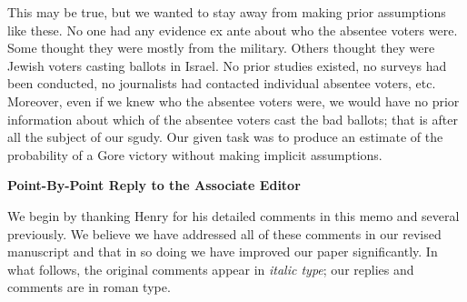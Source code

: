 \documentclass[11pt]{article}
\begin{document}
\begin{enumerate}
  This may be true, but we wanted to stay away from making prior
  assumptions like these.  No one had any evidence ex ante about who
  the absentee voters were.  Some thought they were mostly from the
  military.  Others thought they were Jewish voters casting ballots in
  Israel.  No prior studies existed, no surveys had been conducted, no
  journalists had contacted individual absentee voters, etc.
  Moreover, even if we knew who the absentee voters were, we would
  have no prior information about which of the absentee voters cast
  the bad ballots; that is after all the subject of our sgudy.  Our
  given task was to produce an estimate of the probability of a Gore
  victory without making implicit assumptions.
\end{enumerate}


\clearpage
\begin{center}
  {\bf \Large Point-By-Point Reply to the Associate Editor}
\end{center}

We begin by thanking Henry for his detailed comments in this memo and
several previously.  We believe we have addressed all of these
comments in our revised manuscript and that in so doing we have
improved our paper significantly.  In what follows, the original
comments appear in \emph{italic type}; our replies and comments are in
roman type.

\bigskip
{}
\end{document}

